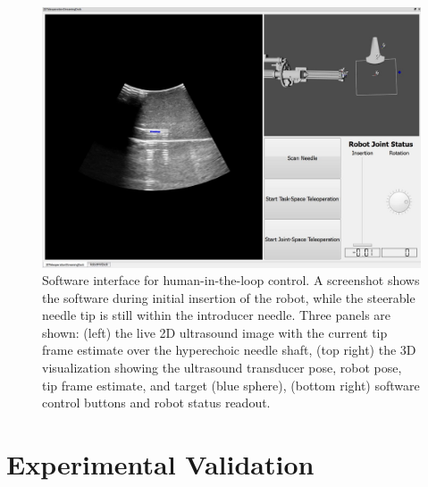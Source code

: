 \begin{figure}[!t]
\centering
\includegraphics[width = 0.9\columnwidth]{./Images/Chapter5/GUI/GUI.jpg}%
\caption[Software interface]{Software interface for human-in-the-loop control. A screenshot shows the software during initial insertion of the robot, while the steerable needle tip is still within the introducer needle. Three panels are shown: (left) the live 2D ultrasound image with the current tip frame estimate over the hyperechoic needle shaft, (top right) the 3D visualization showing the ultrasound transducer pose, robot pose, tip frame estimate, and target (blue sphere), (bottom right) software control buttons and robot status readout.}
\label{fig:GUI}
\end{figure}  

\section{Experimental Validation}
\label{sec:HumanInTheLoopValidation}

